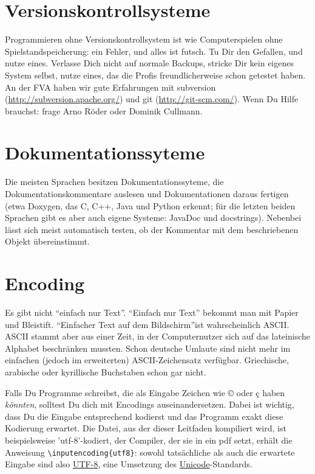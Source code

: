 \documentclass[twoside]{scrreprt}
\begin{document}
\section{Versionskontrollsysteme\label{sec:vcs}}
Programmieren ohne Versionskontrollsystem ist wie Computerspielen ohne 
Spielstandspeicherung: ein Fehler, und alles ist futsch.
Tu Dir den Gefallen, und nutze eines.
Verlasse Dich nicht auf normale Backups, stricke Dir kein eigenes System selbst,
nutze eines, das die Profis freundlicherweise schon getestet haben. 
An der FVA haben wir gute Erfahrungen mit 
subversion (\url{http://subversion.apache.org/})
und git (\url{http://git-scm.com/}).
Wenn Du Hilfe brauchst: frage Arno R\"o{}der oder Dominik Cullmann.  

\section{Dokumentationssyteme}
Die meisten Sprachen besitzen Dokumentationssyteme, die Dokumentationskommentare
auslesen und Dokumentationen daraus fertigen (etwa Doxygen, das C, C++, Java und
Python erkennt; f\"u{}r die letzten beiden Sprachen gibt es aber auch eigene
Systeme: JavaDoc und docstrings). 
Nebenbei l\"a{}sst sich meist automatisch testen, ob der
Kommentar mit dem beschriebenen Objekt \"u{}bereinstimmt. 

\section{Encoding}
Es gibt nicht "`einfach nur Text"'. "`Einfach nur Text"' bekommt man mit Papier 
und Bleistift. "`Einfacher Text auf dem Bildschirm"'ist wahrscheinlich
ASCII. ASCII stammt aber aus einer Zeit, in der Computernutzer sich auf das
lateinische Alphabet beschr\"a{}nken mussten. Schon deutsche Umlaute sind nicht
mehr im einfachen (jedoch im erweiterten) ASCII-Zeichensatz verf\"u{}gbar.
Griechische, arabische oder kyrillische Buchstaben schon gar nicht. 


Falls Du Programme schreibst, die als Eingabe Zeichen wie ©  oder ç haben
\emph{k\"o{}nnten}, solltest Du dich mit Encodings auseinandersetzen. Dabei 
ist wichtig, dass Du die Eingabe entsprechend kodierst und das Programm exakt
diese Kodierung erwartet. Die Datei, aus der dieser Leitfaden kompiliert
wird, ist beispielsweise 'utf-8'-kodiert, der Compiler, der sie in ein pdf 
setzt, erh\"a{}lt die Anweisung \verb+\inputencoding{utf8}+: sowohl 
tats\"a{}chliche als auch die erwartete Eingabe sind also 
\href{http://en.wikipedia.org/wiki/UTF-8}{UTF-8}, eine Umsetzung des
\href{http://en.wikipedia.org/wiki/Unicode}{Unicode}-Standards.
\end{document}
